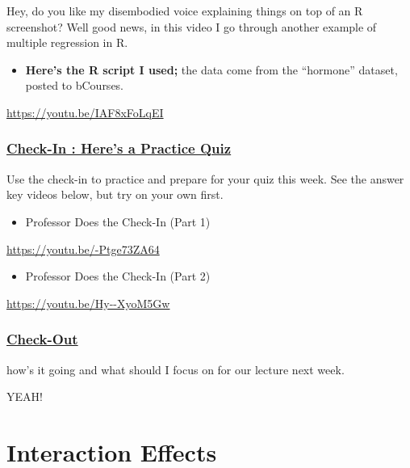 \documentclass[
  letterpaper,
  DIV=11,
  numbers=noendperiod,
  oneside]{scrreprt}
\providecommand{\tightlist}{%
  \setlength{\itemsep}{0pt}\setlength{\parskip}{0pt}}\usepackage{longtable,booktabs,array}
\begin{document}
Hey, do you like my disembodied voice explaining things on top of an R
screenshot? Well good news, in this video I go through another example
of multiple regression in R.

\begin{itemize}
\tightlist
\item
  \textbf{Here's the R script I used;} the data come from the
  ``hormone'' dataset, posted to bCourses.
\end{itemize}

\url{https://youtu.be/IAF8xFoLqEI}

\subsection{\texorpdfstring{\href{https://docs.google.com/forms/d/e/1FAIpQLScrzFncwFj8FqUtnFtboJL-oVk927cORWDuEkQVOTYFWhkyrw/viewform?usp=sf_link}{\textbf{Check-In
: Here's a Practice
Quiz}}}{Check-In : Here's a Practice Quiz}}\label{check-in-heres-a-practice-quiz}

Use the check-in to practice and prepare for your quiz this week. See
the answer key videos below, but try on your own first.

\begin{itemize}
\tightlist
\item
  Professor Does the Check-In (Part 1)
\end{itemize}

\url{https://youtu.be/-Ptge73ZA64}

\begin{itemize}
\tightlist
\item
  Professor Does the Check-In (Part 2)
\end{itemize}

\url{https://youtu.be/Hy--XyoM5Gw}

\subsection{\texorpdfstring{\href{https://docs.google.com/forms/d/e/1FAIpQLSf6cLneQdLKf3iQVOGfXO3TumZIVZKU0eZ18xKetbjMTMdRRw/viewform?usp=sf_link}{Check-Out}}{Check-Out}}\label{check-out}

how's it going and what should I focus on for our lecture next week.

YEAH!

\chapter{Interaction Effects}\label{interaction-effects}
\end{document}
